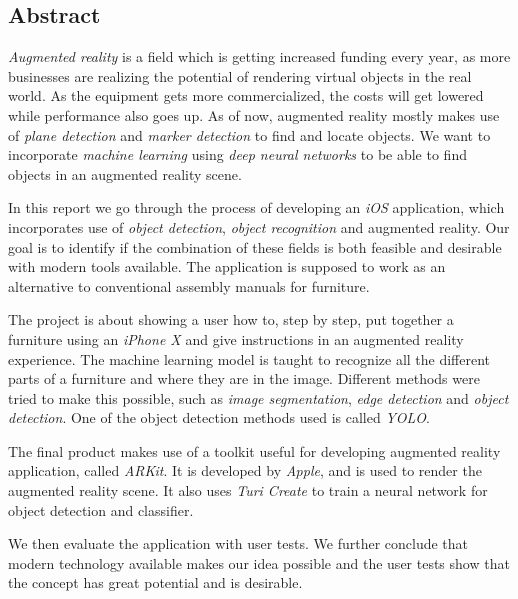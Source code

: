\begin{center}
\section*{Abstract}
\end{center}
\textit{Augmented reality} is a field which is getting increased funding every year, as more businesses are realizing the potential of rendering virtual objects in the real world. As the equipment gets more commercialized, the costs will get lowered while performance also goes up. As of now, augmented reality mostly makes use of \textit{plane detection} and \textit{marker detection} to find and locate objects. We want to incorporate \textit{machine learning} using \textit{deep neural networks} to be able to find objects in an augmented reality scene. 

In this report we go through the process of developing an \textit{iOS} application, which incorporates use of \textit{object detection}, \textit{object recognition} and augmented reality. Our goal is to identify if the combination of these fields is both feasible and desirable with modern tools available. The application is supposed to work as an alternative to conventional assembly manuals for furniture. 

The project is about showing a user how to, step by step, put together a furniture using an \textit{iPhone X} and give instructions in an augmented reality experience.
The machine learning model is taught to recognize all the different parts of a furniture and where they are in the image. Different methods were tried to make this possible, such as \textit{image segmentation}, \textit{edge detection} and \textit{object detection}. One of the object detection methods used is called \textit{YOLO}.

The final product makes use of a toolkit useful for developing augmented reality application, called \textit{ARKit}. It is developed by \textit{Apple}, and is used to render the augmented reality scene. It also uses \textit{Turi Create} to train a neural network for object detection and classifier. 

We then evaluate the application with user tests. We further conclude that modern technology available makes our idea possible and the user tests show that the concept has great potential and is desirable.
\newpage